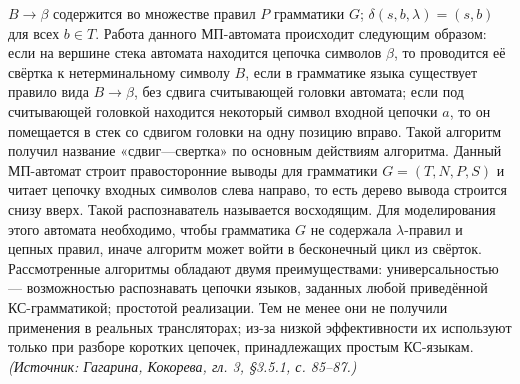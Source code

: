 \documentclass[a4paper,12pt]{article}
\begin{document}
\(B\to\beta\) содержится во множестве правил \(P\) грамматики \(G\); \(\delta(s,b,\lambda)=(s,b)\) для всех \(b\in T\). Работа данного МП-автомата происходит следующим образом: если на вершине стека автомата находится цепочка символов \(\beta\), то проводится её свёртка к нетерминальному символу \(B\), если в грамматике языка существует правило вида \(B\to\beta\), без сдвига считывающей головки автомата; если под считывающей головкой находится некоторый символ входной цепочки \(a\), то он помещается в стек со сдвигом головки на одну позицию вправо. Такой алгоритм получил название «сдвиг—свертка» по основным действиям алгоритма. Данный МП-автомат строит правосторонние выводы для грамматики \(G=(T,N,P,S)\) и читает цепочку входных символов слева направо, то есть дерево вывода строится снизу вверх. Такой распознаватель называется восходящим. Для моделирования этого автомата необходимо, чтобы грамматика \(G\) не содержала \(\lambda\)-правил и цепных правил, иначе алгоритм может войти в бесконечный цикл из свёрток. Рассмотренные алгоритмы обладают двумя преимуществами: универсальностью — возможностью распознавать цепочки языков, заданных любой приведённой КС-грамматикой; простотой реализации. Тем не менее они не получили применения в реальных трансляторах; из-за низкой эффективности их используют только при разборе коротких цепочек, принадлежащих простым КС-языкам.
\textit{(Источник: Гагарина, Кокорева, гл. 3, §3.5.1, с. 85--87.)}
\end{document}
